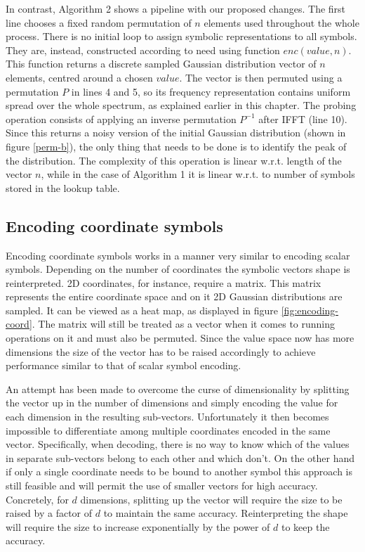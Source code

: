 \documentclass[conference]{IEEEtran}
\begin{document}
		In contrast, Algorithm 2 shows a pipeline with our proposed changes. The first line chooses a fixed random permutation of $n$ elements used throughout the whole process. There is no initial loop to assign symbolic representations to all symbols. They are, instead, constructed according to need using function $enc(value, n)$. This function returns a discrete sampled Gaussian distribution vector of $n$ elements, centred around a chosen $value$. The vector is then permuted using a permutation $P$ in lines 4 and 5, so its frequency representation contains uniform spread over the whole spectrum, as explained earlier in this chapter. The probing operation consists of applying an inverse permutation $P^{-1}$ after IFFT (line 10). Since this returns a noisy version of the initial Gaussian distribution (shown in figure \ref{perm-b}), the only thing that needs to be done is to identify the peak of the distribution. The complexity of this operation is linear w.r.t. length of the vector $n$, while in the case of Algorithm 1 it is linear w.r.t. to number of symbols stored in the lookup table.
		

	\subsection{Encoding coordinate symbols}
			
		Encoding coordinate symbols works in a manner very similar to encoding scalar symbols. Depending on the number of coordinates the symbolic vectors shape is reinterpreted. 2D coordinates, for instance, require a matrix. This matrix represents the entire coordinate space and on it 2D Gaussian distributions are sampled. It can be viewed as a heat map, as displayed in figure \ref{fig:encoding-coord}.	The matrix will still be treated as a vector when it comes to running operations on it and must also be permuted. Since the value space now has more dimensions the size of the vector has to be raised accordingly to achieve performance similar to that of scalar symbol encoding. 
		
		An attempt has been made to overcome the curse of dimensionality by splitting the vector up in the number of dimensions and simply encoding the value for each dimension in the resulting sub-vectors. Unfortunately it then becomes impossible to differentiate among multiple coordinates encoded in the same vector. Specifically, when decoding, there is no way to know which of the values in separate sub-vectors belong to each other and which don't. On the other hand if only a single coordinate needs to be bound to another symbol this approach is still feasible and will permit the use of smaller vectors for high accuracy. Concretely, for $d$ dimensions, splitting up the vector will require the size to be raised by a factor of $d$ to maintain the same accuracy. Reinterpreting the shape will require the size to increase exponentially by the power of $d$ to keep the accuracy.
			
\end{document}
